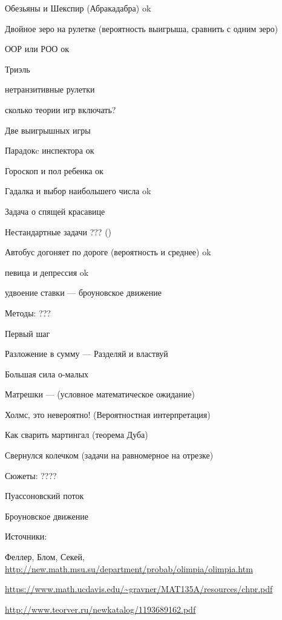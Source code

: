 \documentclass{tufte-handout}
\begin{document}
Обезьяны и Шекспир (Абракадабра) ok

Двойное зеро на рулетке (вероятность выигрыша, сравнить с одним зеро)

ООР или РОО ок

Триэль

нетранзитивные рулетки

сколько теории игр включать? 

Две выигрышных игры

Парадокc инспектора ок

Гороскоп и пол ребенка ок

Гадалка и выбор наибольшего числа ok 

Задача о спящей красавице


Нестандартные задачи ??? ()

Автобус догоняет по дороге (вероятность и среднее) ok

певица и депрессия ok

удвоение ставки --- броуновское движение


Методы: ???

Первый шаг

Разложение в сумму --- Разделяй и властвуй

Большая сила о-малых

Матрешки --- (условное математическое ожидание)

Холмс, это невероятно! (Вероятностная интерпретация)

Как сварить мартингал (теорема Дуба)

Свернулся колечком (задачи на равномерное на отрезке)


Сюжеты: ????

Пуассоновский поток

Броуновское движение


Источники:

Феллер, Блом, Секей, 
\url{http://new.math.msu.su/department/probab/olimpia/olimpia.htm}

\url{https://www.math.ucdavis.edu/~gravner/MAT135A/resources/chpr.pdf}

\url{http://www.teorver.ru/newkatalog/1193689162.pdf}
\end{document}
